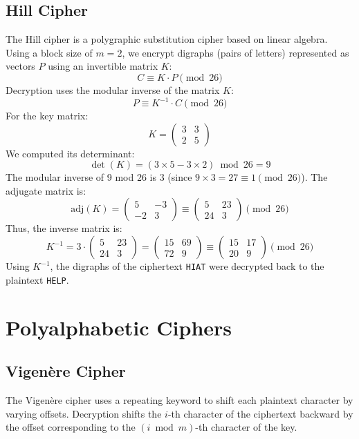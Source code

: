 \documentclass{article}
\begin{document}
\subsection{Hill Cipher}
The Hill cipher is a polygraphic substitution cipher based on linear algebra. Using a block size of $m = 2$, we encrypt digraphs (pairs of letters) represented as vectors $P$ using an invertible matrix $K$:
\[ C \equiv K \cdot P \pmod{26} \]
Decryption uses the modular inverse of the matrix $K$:
\[ P \equiv K^{-1} \cdot C \pmod{26} \]
For the key matrix:
\[ K = \begin{pmatrix} 3 & 3 \\ 2 & 5 \end{pmatrix} \]
We computed its determinant:
\[ \det(K) = (3 \times 5 - 3 \times 2) \bmod 26 = 9 \]
The modular inverse of 9 mod 26 is 3 (since $9 \times 3 = 27 \equiv 1 \pmod{26}$). The adjugate matrix is:
\[ \text{adj}(K) = \begin{pmatrix} 5 & -3 \\ -2 & 3 \end{pmatrix} \equiv \begin{pmatrix} 5 & 23 \\ 24 & 3 \end{pmatrix} \pmod{26} \]
Thus, the inverse matrix is:
\[ K^{-1} = 3 \cdot \begin{pmatrix} 5 & 23 \\ 24 & 3 \end{pmatrix} = \begin{pmatrix} 15 & 69 \\ 72 & 9 \end{pmatrix} \equiv \begin{pmatrix} 15 & 17 \\ 20 & 9 \end{pmatrix} \pmod{26} \]
Using $K^{-1}$, the digraphs of the ciphertext \texttt{HIAT} were decrypted back to the plaintext \texttt{HELP}.

\section{Polyalphabetic Ciphers}

\subsection{Vigen\`ere Cipher}
The Vigen\`ere cipher uses a repeating keyword to shift each plaintext character by varying offsets. Decryption shifts the $i$-th character of the ciphertext backward by the offset corresponding to the $(i \bmod m)$-th character of the key.
\end{document}
